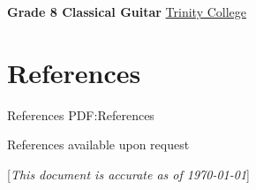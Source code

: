 \documentclass[a4paper,10pt,oneside]{article}
\newcommand{\CVNote}{This document is accurate as of {\today}}
\begin{document}
\begin{body}

\textbf{Grade 8 Classical Guitar}
\href{http://www.trinitycollege.com/}{Trinity College}
\hfill {}



\section
{References}
{References}
{PDF:References}



\par References available upon request

\end{body}


\begin{flushright}
\scriptsize%
[\textit{\CVNote}]%
\hspace{2.0mm}\null
\end{flushright}

\label{LastPage}~
\end{document}
